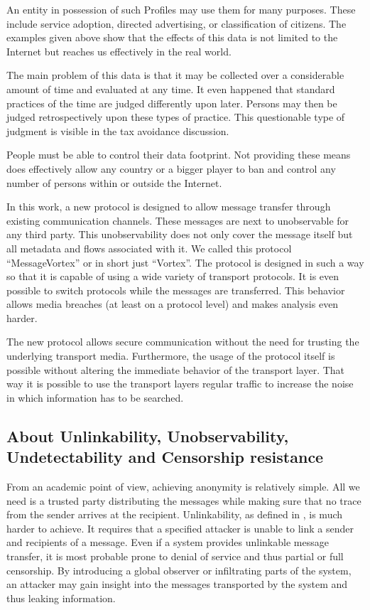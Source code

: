 \documentclass[10pt,journal,compsoc]{IEEEtran}
\begin{document}
An entity in possession of such Profiles may use them for many purposes. These include service adoption, directed advertising, or classification of citizens. The examples given above show that the effects of this data is not limited to the Internet but reaches us effectively in the real world.

The main problem of this data is that it may be collected over a considerable amount of time and evaluated at any time. It even happened that standard practices of the time are judged differently upon later. Persons may then be judged retrospectively upon these types of practice. This questionable type of judgment is visible in the tax avoidance discussion. 

People must be able to control their data footprint. Not providing these means does effectively allow any country or a bigger player to ban and control any number of persons within or outside the Internet.  

In this work, a new protocol is designed to allow message transfer through existing communication channels. These messages are next to unobservable for any third party. This unobservability does not only cover the message itself but all metadata and flows associated with it. We called this protocol ``MessageVortex'' or in short just ``Vortex''. The protocol is designed in such a way so that it is capable of using a wide variety of transport protocols. It is even possible to switch protocols while the messages are transferred. This behavior allows media breaches (at least on a protocol level) and makes analysis even harder.

The new protocol allows secure communication without the need for trusting the underlying transport media. Furthermore, the usage of the protocol itself is possible without altering the immediate behavior of the transport layer. That way it is possible to use the transport layers regular traffic to increase the noise in which information has to be searched. 

\subsection{About Unlinkability, Unobservability, Undetectability and Censorship resistance}
From an academic point of view, achieving anonymity is relatively simple. All we need is a trusted party distributing the messages while making sure that no trace from the sender arrives at the recipient. Unlinkability, as defined in \cite{anon_terminology}, is much harder to achieve. It requires that a specified attacker is unable to link a sender and recipients of a message. Even if a system provides unlinkable message transfer, it is most probable prone to denial of service and thus partial or full censorship. By introducing a global observer or infiltrating parts of the system, an attacker may gain insight into the messages transported by the system and thus leaking information.
\end{document}
